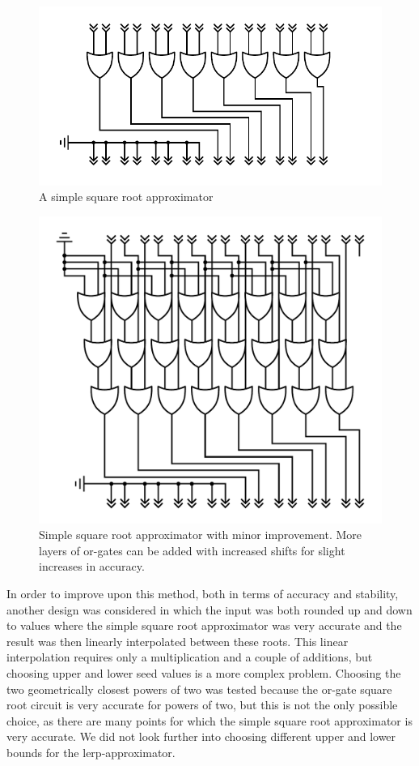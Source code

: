 			\begin{figure}
				\centering
				\caption{A simple square root approximator}
				\label{orsqrt}
				\includegraphics[width=0.75\linewidth]{figure/pdf/simpleOr.pdf} 
			\end{figure}

			\begin{figure}
				\centering
				\caption{Simple square root approximator with minor improvement.
					More layers of or-gates can be added with increased shifts 
					for slight increases in accuracy. }
				\label{orsqrt2}
				\includegraphics[width=0.75\linewidth]{figure/pdf/sqrt3Or.pdf} 
			\end{figure}

			In order to improve upon this method, both in terms of accuracy and
			stability, another design was considered in which the input was
			both rounded up and down to values where the simple square root
			approximator was very accurate and the result was then linearly
			interpolated between these roots. This linear interpolation
			requires only a multiplication and a couple of additions, but
			choosing upper and lower seed values is a more complex problem.
			Choosing the two geometrically closest powers of two was tested
			because the or-gate square root circuit is very accurate for powers
			of two, but this is not the only possible choice, as there are many 
			points for which the simple square root approximator is very 
			accurate. We did not look further into choosing different upper and
			lower bounds for the lerp-approximator.


